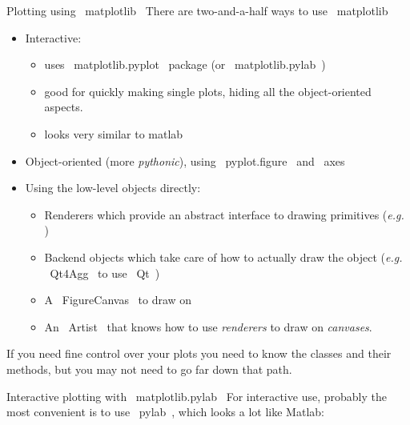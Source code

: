 \documentclass[10pt, t]{beamer}
\let\verb=\codeDelimTwiddles
\begin{document}
\begin{frame}[fragile,label=sec-3-7]{Plotting using \verb~matplotlib~}
 There are two-and-a-half ways to use \verb~matplotlib~
\pause
\begin{itemize}
\item Interactive:
\begin{itemize}
\item uses \verb~matplotlib.pyplot~ package (or \verb~matplotlib.pylab~)
\item good for quickly making single plots, hiding all the object-oriented aspects.
\item looks very similar to matlab
\end{itemize}
\end{itemize}

\pause
\begin{itemize}
\item Object-oriented (more \emph{pythonic}), using \verb~pyplot.figure~ and \verb~axes~
\end{itemize}

\pause
\begin{itemize}
\item Using the low-level objects directly:
\begin{itemize}
\item Renderers which provide an abstract interface to drawing primitives (\emph{e.g.} )
\item Backend objects which take care of how to actually draw the object (\emph{e.g.} \verb~Qt4Agg~ to use \verb~Qt~)
\item A \verb~FigureCanvas~ to draw on
\item An \verb~Artist~ that knows how to use \emph{renderers} to draw on \emph{canvases}.
\end{itemize}
\end{itemize}
\pause

If you need fine control over your plots you need to know the classes and their methods, but
you may not need to go far down that path.
\end{frame}

\begin{frame}[fragile,label=sec-3-8]{Interactive plotting with \verb~matplotlib.pylab~}
 For interactive use, probably the most convenient is to use \verb~pylab~, which
looks a lot like Matlab:

\end{frame}
\end{document}
